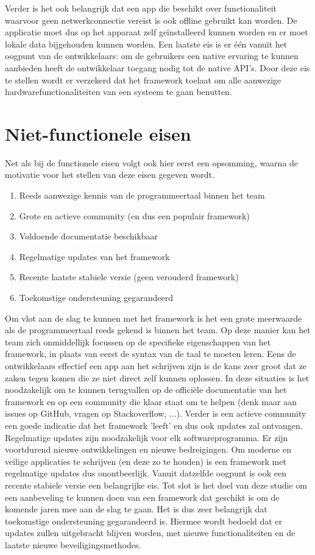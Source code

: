 Verder is het ook belangrijk dat een app die beschikt over functionaliteit waarvoor geen netwerkconnectie vereist is ook offline gebruikt kan worden. De applicatie moet dus op het apparaat zelf geïnstalleerd kunnen worden en er moet lokale data bijgehouden kunnen worden. Een laatste eis is er één vanuit het oogpunt van de ontwikkelaars: om de gebruikers een native ervaring te kunnen aanbieden heeft de ontwikkelaar toegang nodig tot de native API's. Door deze eis te stellen wordt er verzekerd dat het framework toelaat om alle aanwezige hardwarefunctionaliteiten van een systeem te gaan benutten.

\section{Niet-functionele eisen}
\label{sec:nietFunctioneleEisen}

Net als bij de functionele eisen volgt ook hier eerst een opsomming, waarna de motivatie voor het stellen van deze eisen gegeven wordt.

\begin{enumerate}
    \item Reeds aanwezige kennis van de programmeertaal binnen het team
    \item Grote en actieve community (en dus een populair framework)
    \item Voldoende documentatie beschikbaar
    \item Regelmatige updates van het framework
    \item Recente laatste stabiele versie (geen verouderd framework)
    \item Toekomstige ondersteuning gegarandeerd    
\end{enumerate}

Om vlot aan de slag te kunnen met het framework is het een grote meerwaarde als de programmeertaal reeds gekend is binnen het team. Op deze manier kan het team zich onmiddellijk focussen op de specifieke eigenschappen van het framework, in plaats van eerst de syntax van de taal te moeten leren. Eens de ontwikkelaars effectief een app aan het schrijven zijn is de kans zeer groot dat ze zaken tegen komen die ze niet direct zelf kunnen oplossen. In deze situaties is het noodzakelijk om te kunnen terugvallen op de officiële documentatie van het framework en op een community die klaar staat om te helpen (denk maar aan issues op GitHub, vragen op Stackoverflow, ...). Verder is een actieve community een goede indicatie dat het framework 'leeft' en dus ook updates zal ontvangen. Regelmatige updates zijn noodzakelijk voor elk softwareprogramma. Er zijn voortdurend nieuwe ontwikkelingen en nieuwe bedreigingen. Om moderne en veilige applicaties te schrijven (en deze zo te houden) is een framework met regelmatige updates dus onontbeerlijk. Vanuit datzelfde oogpunt is ook een recente stabiele versie een belangrijke eis. Tot slot is het doel van deze studie om een aanbeveling te kunnen doen van een framework dat geschikt is om de komende jaren mee aan de slag te gaan. Het is dus zeer belangrijk dat toekomstige ondersteuning gegarandeerd is. Hiermee wordt bedoeld dat er updates zullen uitgebracht blijven worden, met nieuwe functionaliteiten en de laatste nieuwe beveiligingsmethodes.